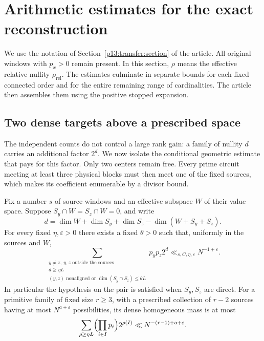 \section{Arithmetic estimates for the exact reconstruction}
\label{p2:technical-transfer}

We use the notation of Section~\ref{p13:transfer:section} of the article.
All original windows with $p_x>0$ remain present. In this section,
$\rho$ means the effective relative nullity $\rho_{\mathrm{rel}}$.
The estimates culminate in separate bounds for each fixed connected
order and for the entire remaining range of cardinalities. The article
then assembles them using the positive stopped expansion.

\subsection{Two dense targets above a prescribed space}

The independent counts do not control a large rank gain: a family of
nullity $d$ carries an additional factor $2^d$. We now isolate the
conditional geometric estimate that pays for this factor. Only two
centers remain free. Every prime circuit meeting at least three
physical blocks must then meet one of the fixed sources, which makes
its coefficient enumerable by a divisor bound.

\begin{lemma}
\label{p13:transfer:dense-targets}
Fix a number $s$ of source windows and an effective subspace $W$ of
their value space. Suppose $S_y\cap W=S_z\cap W=0$, and write
\[
 d=\dim W+\dim S_y+\dim S_z-\dim(W+S_y+S_z).
\]
For every fixed $\eta,\varepsilon>0$ there exists a fixed $\theta>0$
such that, uniformly in the sources and $W$,
\begin{equation}
 \sum_{\substack{y\ne z,\ y,z\text{ outside the sources}\\
             d\geq\eta L\\
             (y,z)\text{ nonaligned or }\dim(S_y\cap S_z)\leq\theta L}}
         p_yp_z2^d\ll_{s,C,\eta,\varepsilon}N^{-1+\varepsilon}.
 \label{p13:transfer:dense-target-bound}
\end{equation}
In particular the hypothesis on the pair is satisfied when $S_y,S_z$
are direct. For a primitive family of fixed size $r\geq3$, with a
prescribed collection of $r-2$ sources having at most $N^{a+\varepsilon}$
possibilities, its dense homogeneous mass is at most
\begin{equation}
 \sum_{\rho\geq\eta L}\Bigl(\prod_{i\in I}p_i\Bigr)2^{\rho(I)}
          \ll N^{-(r-1)+a+\varepsilon}.
 \label{p13:transfer:restricted-dense}
\end{equation}
\end{lemma}

